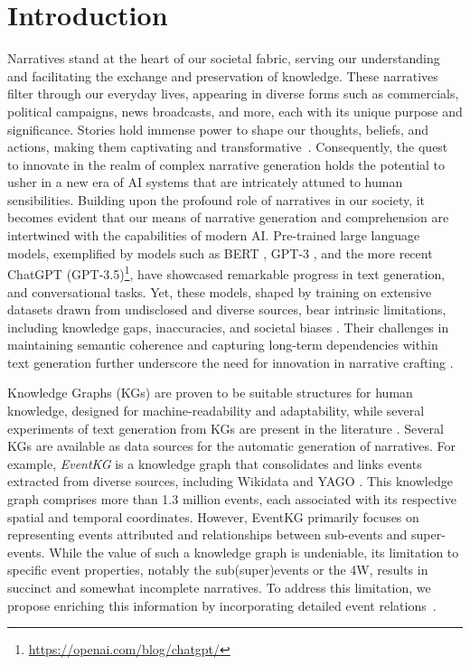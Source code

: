 \documentclass[
hf, %
]{ceurart}
\begin{document}
\section{Introduction}
\label{sec:introduction}
Narratives stand at the heart of our societal fabric, serving our understanding and facilitating the exchange and preservation of knowledge. These narratives filter through our everyday lives, appearing in diverse forms such as commercials, political campaigns, news broadcasts, and more, each with its unique purpose and significance. 
Stories hold immense power to shape our thoughts, beliefs, and actions, making them captivating and transformative~\cite{green2004understanding}. Consequently, the quest to innovate in the realm of complex narrative generation holds the potential to usher in a new era of AI systems that are intricately attuned to human sensibilities. Building upon the profound role of narratives in our society, it becomes evident that our means of narrative generation and comprehension are intertwined with the capabilities of modern AI. Pre-trained large language models, exemplified by models such as BERT \cite{BERT}, GPT-3 \cite{GPT-3}, and the more recent ChatGPT (GPT-3.5)\footnote{\url{https://openai.com/blog/chatgpt/}}, have showcased remarkable progress in text generation, and conversational tasks. Yet, these models, shaped by training on extensive datasets drawn from undisclosed and diverse sources, bear intrinsic limitations, including knowledge gaps, inaccuracies, and societal biases \cite{GPT-3,documenting_corpora}. Their challenges in maintaining semantic coherence and capturing long-term dependencies within text generation further underscore the need for innovation in narrative crafting \cite{PLM_survey,semantic_coherence}. 

Knowledge Graphs (KGs) are proven to be suitable structures for human knowledge, designed for machine-readability and adaptability, while several experiments of text generation from KGs are present in the literature \cite{KG_survey}. Several KGs are available as data sources for the automatic generation of narratives. For example, \textit{EventKG} \cite{gottschalk2019eventkg} is a knowledge graph that consolidates and links events extracted from diverse sources, including Wikidata and YAGO \cite{hoffart2013yago2}. This knowledge graph comprises more than 1.3 million events, each associated with its respective spatial and temporal coordinates. However, EventKG primarily focuses on representing events attributed and relationships between sub-events and super-events. While the value of such a knowledge graph is undeniable, its limitation to specific event properties, notably the sub(super)events or the 4W, results in succinct and somewhat incomplete narratives. To address this limitation, we propose enriching this information by incorporating detailed event relations~\cite{beyond_causality}.
\end{document}
